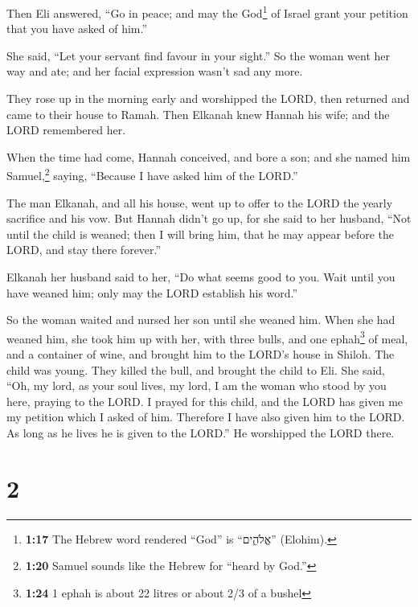  Then Eli answered, ``Go in peace; and may the
God\footnote{\textbf{1:17} The Hebrew word rendered ``God'' is
  ``אֱלֹהִ֑ים'' (Elohim).} of Israel grant your petition that you have
asked of him.''

 She said, ``Let your servant find favour in your
sight.'' So the woman went her way and ate; and her facial expression
wasn't sad any more.

 They rose up in the morning early and worshipped the
LORD, then returned and came to their house to Ramah. Then Elkanah knew
Hannah his wife; and the LORD remembered her.

 When the time had come, Hannah conceived, and bore a
son; and she named him Samuel,\footnote{\textbf{1:20} Samuel sounds like
  the Hebrew for ``heard by God.''} saying, ``Because I have asked him
of the LORD.''

 The man Elkanah, and all his house, went up to offer to
the LORD the yearly sacrifice and his vow.  But Hannah
didn't go up, for she said to her husband, ``Not until the child is
weaned; then I will bring him, that he may appear before the LORD, and
stay there forever.''

 Elkanah her husband said to her, ``Do what seems good to
you. Wait until you have weaned him; only may the LORD establish his
word.''

So the woman waited and nursed her son until she weaned him.
 When she had weaned him, she took him up with her, with
three bulls, and one ephah\footnote{\textbf{1:24} 1 ephah is about 22
  litres or about 2/3 of a bushel} of meal, and a container of wine, and
brought him to the LORD's house in Shiloh. The child was young.
 They killed the bull, and brought the child to Eli.
 She said, ``Oh, my lord, as your soul lives, my lord, I
am the woman who stood by you here, praying to the LORD. 
I prayed for this child, and the LORD has given me my petition which I
asked of him.  Therefore I have also given him to the
LORD. As long as he lives he is given to the LORD.'' He worshipped the
LORD there.

\hypertarget{section-1}{%
\section{2}\label{section-1}}


